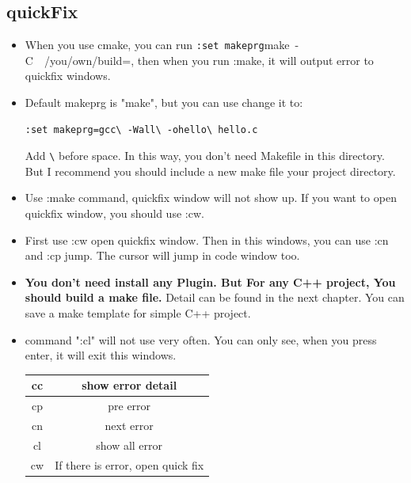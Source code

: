 \documentclass[a4paper,12pt,twoside]{book}
\begin{document}
\subsection{quickFix}
\begin{itemize}
		\item When you use cmake, you can run \verb=:set makeprg=make\ -C\ ~/you/own/build=, then when you run :make, it will output error to quickfix windows.


\item Default makeprg is "make", but you can use change it to: 
\begin{verbatim}
:set makeprg=gcc\ -Wall\ -ohello\ hello.c 
\end{verbatim}
Add \verb=\= before space. In this way, you don't need Makefile in this directory. But I recommend you should include a new make file your project directory.

\item Use :make command, quickfix window will not show up. If you want to open quickfix window, you should use :cw. 

\item First use :cw open quickfix window. Then in this windows, you can use :cn and :cp jump. The cursor will jump in code window  too. 

\item \textbf{You don't need install any Plugin. But For any C++ project, You should build a make file.} Detail can be found in the next chapter.  You can save a make template for simple C++ project. 

\item command ":cl" will not use very often. You can only see, when you press enter, it will exit this windows. 

\begin{tabular}{c|c}
\hline
cc  &    show error detail \\
\hline
cp  &     pre error \\ 
\hline
cn &   next error\\ 
\hline
cl &     show all error\\
\hline
cw &    If there is error, open quick fix \\ 
\end{tabular}
\end{itemize}
\end{document}

